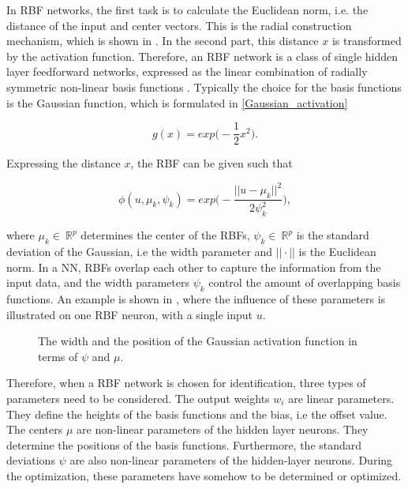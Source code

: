  In RBF networks, the first task is to calculate the Euclidean norm, i.e. the distance of the input and center vectors. This is the radial construction mechanism, which is shown in . In the second part, this distance $x$ is transformed by the activation function. Therefore, an RBF network is a class of single hidden layer feedforward networks, expressed as the linear combination of radially symmetric non-linear basis functions \cite{RBF_article}. Typically the choice for the basis functions is the Gaussian function, which is formulated in \eqref{Gaussian_activation} 

\begin{equation}
\label{Gaussian_activation}
g(x) = exp \Big(-\frac{1}{2}x^2\Big).
\end{equation}

Expressing the distance $x$, the RBF can be given such that

 \begin{equation}
\label{Gaussian_activation1}
\phi(u,\mu_k, \psi_k) = exp \Big(-\frac{||u-\mu_k||^2}{2\psi_k^2}\Big), 
\end{equation}

where $\mu_k \in \: \mathbb{R}^{p}$ determines the center of the RBFs, $\psi_k \in \: \mathbb{R}^{p}$ is the standard deviation of the Gaussian, i.e the width parameter and $||\cdot||$ is the Euclidean norm. In a NN, RBFs overlap each other to capture the information from the input data, and the width parameters $\psi_k$ control the amount of overlapping basis functions. An example is shown in , where the influence of these parameters is illustrated on one RBF neuron, with a single input $u$. 

\begin{figure}[H]
\centering
 
\caption{The width and the position of the Gaussian activation function in terms of $\psi$ and $\mu$.}
\label{fig:rbf_pram}
\end{figure}

\vspace{-3mm}

Therefore, when a RBF network is chosen for identification, three types of parameters need to be considered. The output weights $w_i$ are linear parameters. They define the heights of the basis functions and the bias, i.e the offset value. The centers $\mu$ are non-linear parameters of the hidden layer neurons. They determine the positions of the basis functions. Furthermore, the standard deviations $\psi$ are also non-linear parameters of the hidden-layer neurons. During the optimization, these parameters have somehow to be determined or optimized. 

